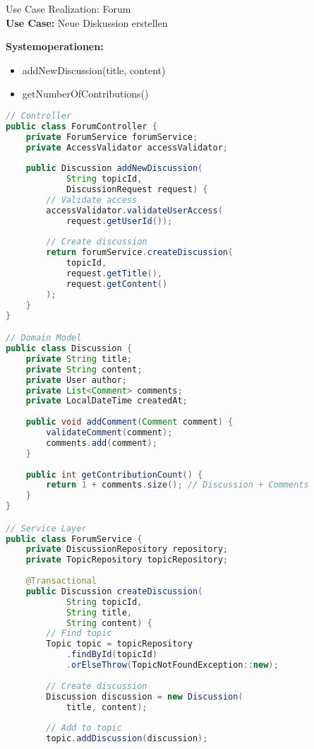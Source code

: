 \begin{example2}{Use Case Realization: Forum}\\
\textbf{Use Case:} Neue Diskussion erstellen

\textbf{Systemoperationen:}
\begin{itemize}
    \item addNewDiscussion(title, content)
    \item getNumberOfContributions()
\end{itemize}

\begin{lstlisting}[language=Java, style=basesmol]
// Controller
public class ForumController {
    private ForumService forumService;
    private AccessValidator accessValidator;
    
    public Discussion addNewDiscussion(
            String topicId, 
            DiscussionRequest request) {
        // Validate access
        accessValidator.validateUserAccess(
            request.getUserId());
            
        // Create discussion
        return forumService.createDiscussion(
            topicId, 
            request.getTitle(),
            request.getContent()
        );
    }
}

// Domain Model
public class Discussion {
    private String title;
    private String content;
    private User author;
    private List<Comment> comments;
    private LocalDateTime createdAt;
    
    public void addComment(Comment comment) {
        validateComment(comment);
        comments.add(comment);
    }
    
    public int getContributionCount() {
        return 1 + comments.size(); // Discussion + Comments
    }
}

// Service Layer
public class ForumService {
    private DiscussionRepository repository;
    private TopicRepository topicRepository;
    
    @Transactional
    public Discussion createDiscussion(
            String topicId,
            String title,
            String content) {
        // Find topic
        Topic topic = topicRepository
            .findById(topicId)
            .orElseThrow(TopicNotFoundException::new);
            
        // Create discussion
        Discussion discussion = new Discussion(
            title, content);
            
        // Add to topic
        topic.addDiscussion(discussion);
        

\end{lstlisting}
\end{example2}
